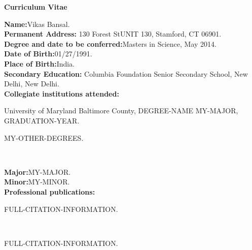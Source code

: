 \begin{titlepage}

\begin{center}
\vspace{0.1in}
\large{\bf Curriculum Vitae}
\bigskip \bigskip
\end{center}

\begin{flushleft}
  {\bf Name:}{\hspace{3mm}}Vikas Bansal.\\
	{\bf Permanent Address:}{\hspace{3mm}} 130 Forest StUNIT 130, Stamford, CT 06901. \\
	{\bf Degree and date to be conferred:}{\hspace{3mm}}Masters in Science, May 2014. \\
	{\bf Date of Birth:}{\hspace{3mm}}01/27/1991. \\
	{\bf Place of Birth:}{\hspace{3mm}}India. \\
	{\bf Secondary Education:}{\hspace{3mm}} Columbia Foundation Senior Secondary School, New Delhi, New Delhi.\\
	{\bf Collegiate institutions attended:}\\
	\begin{singlespace} 
	{\hspace{0.4in}}University of Maryland Baltimore County, DEGREE-NAME MY-MAJOR, GRADUATION-YEAR. \\
	{\hspace{0.4in}}\parbox[t]{5.5in}{MY-OTHER-DEGREES.} \\
	\end{singlespace} 
	\vspace{8pt}
	{\bf Major:}{\hspace{3mm}}MY-MAJOR.\\
	{\bf Minor:}{\hspace{3mm}}MY-MINOR.\\
	{\bf Professional publications:}\\
	\begin{singlespace} 
  {\hspace{0.4in}} \parbox[t]{5.5in}{FULL-CITATION-INFORMATION.}\\
  {\vspace{5pt}}
  {\hspace{0.4in}} \parbox[t]{5.5in}{FULL-CITATION-INFORMATION.}\\

\end{singlespace}
\end{flushleft}
\end{titlepage}
